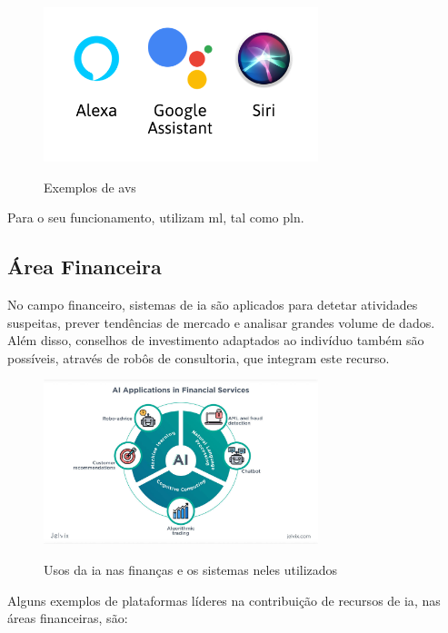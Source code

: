 \documentclass{report}
\begin{document}
\begin{figure}[H]
\caption{Exemplos de \ac{avs}}
\centering
\includegraphics[width=8cm]{imagens/assistants.png}
\label{assistants}
\end{figure}

\nocite{assistants}

	Para o seu funcionamento, utilizam \ac{ml}, tal como \ac{pln}. \cite{av1} \cite{av2}

\subsection{Área Financeira}
\label{subsec.financeira}
	No campo financeiro, sistemas de \ac{ia} são aplicados para detetar atividades suspeitas, prever tendências de mercado e analisar grandes volume de dados. Além disso, conselhos de investimento adaptados ao indivíduo também são possíveis, através de robôs de consultoria, que integram este recurso. \cite{financeiro1} \cite{financeiro2}
	
\begin{figure}[H]
\caption{Usos da \ac{ia} nas finanças e os sistemas neles utilizados}
\centering
\includegraphics[width=8cm]{imagens/finances.jpg}
\label{finances}
\end{figure}

\nocite{finances}

	Alguns exemplos de plataformas líderes na contribuição de recursos de \ac{ia}, nas áreas financeiras, são: \cite{empresas}
\end{document}
